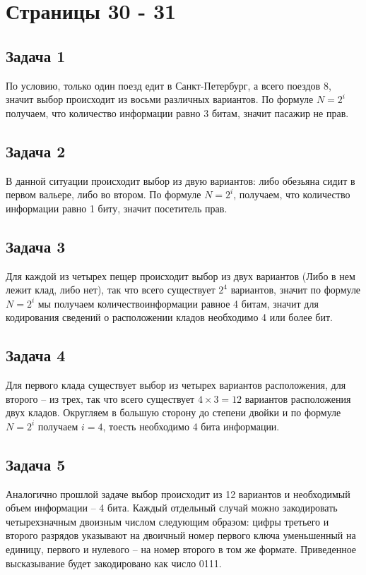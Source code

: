 \section{Страницы 30 - 31}
\subsection{Задача 1}
По условию, только один поезд едит в Санкт-Петербург, а всего поездов 8, значит 
выбор происходит из восьми различных вариантов. По формуле $ N = 2^{i} $
получаем, что количество информации равно 3 битам, значит пасажир не прав.

\subsection{Задача 2}
В данной ситуации происходит выбор из двую вариантов: либо обезьяна сидит в
первом вальере, либо во втором. По формуле $ N = 2^{i} $, получаем, что 
количество информации равно 1 биту, значит посетитель прав.

\subsection{Задача 3}
Для каждой из четырех пещер происходит выбор из двух вариантов (Либо в нем лежит 
клад, либо нет), так что всего существует $ 2^{4} $ вариантов, значит по 
формуле $ N = 2^{i} $ мы получаем количествоинформации равное 4 битам, значит 
для кодирования сведений о расположении кладов необходимо 4 или более бит.

\subsection{Задача 4}
Для первого клада существует выбор из четырех вариантов расположения, для второго --
из трех, так что всего существует $ 4 \times 3 = 12 $ вариантов расположения
двух кладов. Округляем в большую сторону до степени двойки и по формуле 
$ N = 2^{i} $ получаем $ i = 4 $, тоесть необходимо 4 бита информации.

\subsection{Задача 5}
Аналогично прошлой задаче выбор происходит из 12 вариантов и необходимый 
объем информации -- 4 бита. Каждый отдельный случай можно закодировать 
четырехзначным двоизным числом следующим образом: цифры третьего и второго
разрядов указывают на двоичный номер первого ключа уменьшенный на единицу,
первого и нулевого -- на номер второго в том же формате. Приведенное высказывание 
будет закодировано как число 0111.


